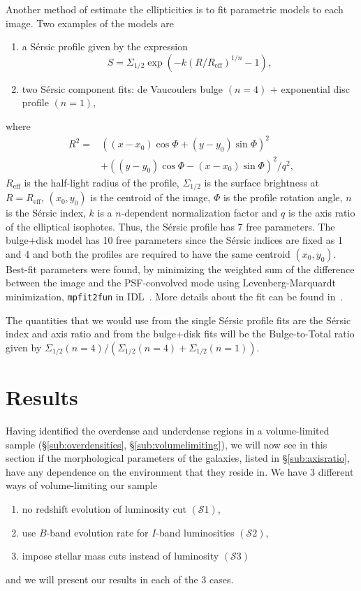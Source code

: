 \documentclass[twocolumn,useAMS,usenatbib]{mn2e}
\newcommand{\rachel}[1]{}
\newcommand{\arun}[1]{}
\newcommand{\sersic}{S\'{e}rsic }
\newcommand{\btt}{Bulge-to-Total }
\newcommand{\s}{\ensuremath{\mathcal{S}}}
\begin{document}
Another method of estimate the ellipticities is to fit parametric models to each image. Two examples of the models are
\begin{enumerate}
 \item a \sersic profile given by the expression 
       \begin{equation} 
    S = \Sigma_{1/2}\exp{\left( -k(R/R_{\text{eff}})^{1/n} -1 \right)},
       \end{equation}
       \item two \sersic component fits: de Vaucoulers bulge $(n=4)$ + exponential disc profile $(n=1)$,
\end{enumerate}
where \begin{align*} R^2 = & ((x-x_0)\cos\Phi+(y-y_0)\sin\Phi)^2  \\ & + ((y-y_0)\cos\Phi-(x-x_0)\sin\Phi)^2/q^2, \end{align*}
$R_{\text{eff}}$ is the half-light radius of the profile, $\Sigma_{1/2}$ is the surface brightness at $R=R_{\text{eff}}$, $(x_0,y_0)$ is the centroid of the image,
$\Phi$ is the profile rotation angle, $n$ is the \sersic index, $k$ is a $n$-dependent normalization factor and $q$ is the axis ratio of the elliptical isophotes.
Thus, the \sersic profile has 7 free parameters. The bulge+disk model has 10 free parameters since the \sersic indices are fixed as 1 and 4
and both the profiles are required to have the same centroid $(x_0,y_0)$. Best-fit parameters were found, by minimizing the weighted
sum of the difference between the image and the PSF-convolved mode
using Levenberg-Marquardt minimization, \texttt{mpfit2fun} in IDL~\citep{mpfit2fun}. More details about the fit can be found
in~\cite{Claire_Fits}.

The quantities that we would use from the single \sersic profile fits are the \sersic index and axis ratio
and from the bulge+disk fits will be the \btt ratio given by ${\Sigma_{1/2}(n=4)}/{\left(\Sigma_{1/2}(n=4)+\Sigma_{1/2}(n=1)\right)}$.

\section{Results}
\label{S:results}
Having identified the overdense and underdense regions in a volume-limited sample (\S\ref{sub:overdensities}, \S\ref{sub:volumelimiting}), we will now see in this section if the morphological
parameters of the galaxies, listed in \S\ref{sub:axisratio}, have any dependence on the environment that they reside in. We have 3 different ways of volume-limiting our sample
\begin{enumerate}
 \item no redshift evolution of luminosity cut $(\s1)$,
 \item use $B$-band evolution rate for $I$-band luminosities $(\s2)$,
 \item impose stellar mass cuts instead of luminosity $(\s3)$
\end{enumerate}
and we will present our results in each of the 3 cases. 
\rachel{Say how this connects to the 3 samples S1, S2, and S3 that you defined earlier.} \arun{Done.}
\end{document}
